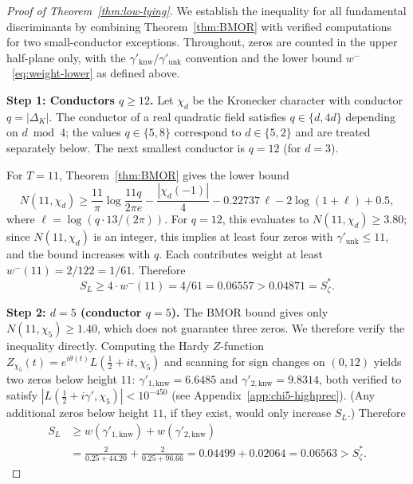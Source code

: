 \documentclass[12pt,reqno]{amsart}
\theoremstyle{plain}
\theoremstyle{definition}
\theoremstyle{remark}
\newcommand{\half}{\tfrac{1}{2}}
\begin{document}
\begin{proof}[Proof of Theorem~\ref{thm:low-lying}]
We establish the inequality for all fundamental discriminants by combining Theorem~\ref{thm:BMOR} with verified computations for two small-conductor exceptions.  Throughout, zeros are counted in the upper half-plane only, with the $\gamma'_{\mathrm{knw}}$/$\gamma'_{\mathrm{unk}}$ convention and the lower bound $w^-$~\eqref{eq:weight-lower} as defined above.

\medskip\noindent\textbf{Step 1: Conductors $q \geq 12$.}
Let $\chi_d$ be the Kronecker character with conductor $q = |\Delta_K|$.  The conductor of a real quadratic field satisfies $q \in \{d, 4d\}$ depending on $d \bmod 4$; the values $q \in \{5, 8\}$ correspond to $d \in \{5, 2\}$ and are treated separately below.  The next smallest conductor is $q = 12$ (for $d = 3$).

For $T = 11$, Theorem~\ref{thm:BMOR} gives the lower bound
\[
  N(11, \chi_d) \geq \frac{11}{\pi}\log\frac{11q}{2\pi e} - \frac{|\chi_d(-1)|}{4} - 0.22737\,\ell - 2\log(1+\ell) + 0.5,
\]
where $\ell = \log(q \cdot 13/(2\pi))$.  For $q = 12$, this evaluates to $N(11, \chi_d) \geq 3.80$; since $N(11,\chi_d)$ is an integer, this implies at least four zeros with $\gamma'_{\mathrm{unk}} \leq 11$, and the bound increases with $q$.  Each contributes weight at least $w^-(11) = 2/122 = 1/61$.  Therefore
\[
  S_L \geq 4 \cdot w^-(11) = 4/61 = 0.06557 > 0.04871 = S_\zeta^*.
\]

\medskip\noindent\textbf{Step 2: $d = 5$ (conductor $q = 5$).}
The BMOR bound gives only $N(11, \chi_5) \geq 1.40$, which does not guarantee three zeros.  We therefore verify the inequality directly.  Computing the Hardy $Z$-function $Z_{\chi_5}(t) = e^{i\theta(t)} L(\half + it, \chi_5)$ and scanning for sign changes on $(0, 12)$ yields two zeros below height $11$: $\gamma'_{1,\mathrm{knw}} = 6.6485$ and $\gamma'_{2,\mathrm{knw}} = 9.8314$, both verified to satisfy $|L(\tfrac{1}{2} + i\gamma', \chi_5)| < 10^{-450}$ (see Appendix~\ref{app:chi5-highprec}).  (Any additional zeros below height $11$, if they exist, would only increase $S_L$.)  Therefore
\begin{align*}
  S_L &\geq w(\gamma'_{1,\mathrm{knw}}) + w(\gamma'_{2,\mathrm{knw}}) \\
  &= \frac{2}{0.25 + 44.20} + \frac{2}{0.25 + 96.66} = 0.04499 + 0.02064 = 0.06563 > S_\zeta^*.
\end{align*}


\end{proof}
\end{document}
